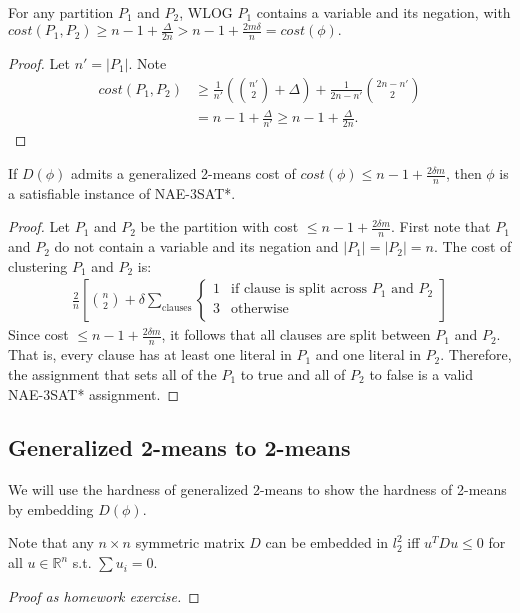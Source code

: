 \begin{lemma} \label{different-partitions}
For any partition $P_1$ and $P_2$, WLOG $P_1$ contains a variable and
its negation, with $cost(P_1,P_2) \ge n - 1 + \frac{\Delta}{2n} > n -
1 + \frac{2m\delta}{n} = cost(\phi).$ 
\end{lemma}

\begin{proof}
Let $n' = |P_1|$.  Note
\begin{align*}
cost(P_1,P_2) &\ge \frac{1}{n'}({n' \choose 2} + \Delta ) +
\frac{1}{2n-n'}{2n-n' \choose 2}  \\ 
&= n - 1 + \frac{\Delta}{n'} \ge n-1 +\frac{\Delta}{2n}.
\end{align*}
\end{proof}


\begin{lemma} \label{satisfiable-instance}
If $D(\phi)$  admits a generalized 2-means cost of $cost(\phi) \le n -
1 + \frac{2\delta m}{n}$, then $\phi$ is a satisfiable instance of
NAE-3SAT*. 
\end{lemma}

\begin{proof}
Let $P_1$ and $P_2$ be the partition with cost $\le n - 1 +
\frac{2\delta m}{n}$.  First note that $P_1$ and $P_2$ do not contain
a variable and its negation and $|P_1| = |P_2| = n$.  The cost of
clustering $P_1$ and $P_2$ is:
\begin{align*}
  \frac{2}{n} \left[ {n \choose 2} + \delta \sum_{\textrm{clauses}} 
  \begin{cases}
    1 & \textrm{if clause is split across $P_1$ and $P_2$}\\  
    3 & \textrm{otherwise} \\ 
  \end{cases}\right]
\end{align*}
Since cost $\le n - 1 + \frac{2\delta m}{n}$, it follows that all
clauses are split between $P_1$ and $P_2$.  That is, every clause has
at least one literal in $P_1$ and one literal in $P_2$.  Therefore,
the assignment that sets all of the $P_1$ to true and all of $P_2$ to
false is a valid NAE-3SAT* assignment. 
\end{proof}



\subsection{Generalized 2-means to 2-means}
We will use the hardness of generalized 2-means to show the hardness
of 2-means by embedding $D(\phi)$.
\begin{fact}
Note that any $n \times n$ symmetric matrix $D$ can be embedded in
$l_2^2$ iff $u^TDu  \le 0$ for all $u \in \mathbb{R}^n$ s.t. $\sum u_i
= 0$. 
\end{fact}
\begin{proof}[Proof as homework exercise]
\end{proof}

